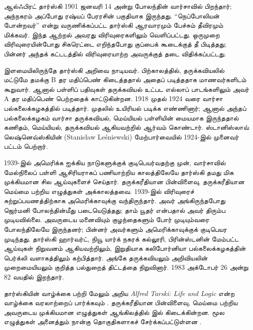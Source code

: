 \documentclass[../../../include/open-logic-section]{subfiles}
\begin{document}



ஆல்ஃபிரட் தார்ஸ்கி 1901 ஜனவரி 14 அன்று போலந்தின் வார்சாவில் பிறந்தார்;
அந்நகரம் அப்போது ரஷ்யப் பேரரசின் பகுதியாக இருந்தது. ``நெப்போலியன்
போன்றவர்'' என்று வருணிக்கப்பட்ட தார்ஸ்கி ஆரவாரமும் பேச்சும் தீவிரமும்
மிக்கவர். இந்த ஆற்றல் அவரது விரிவுரைகளிலும் வெளிப்பட்டது. ஒருமுறை
விரிவுரையின்போது சிகரெட்டை எறிந்தபோது குப்பைக் கூடைக்குத் தீ
பிடித்தது; பின்னர் அந்தக் கட்டடத்தில் விரிவுரையாற்ற அவருக்குத்
தடை விதிக்கப்பட்டது.

இளமையிலிருந்தே தார்ஸ்கி அறிவை நாடியவர். பிற்காலத்தில், தருக்கவியலில்
மட்டுமே தமக்கு B தர மதிப்பெண் கிடைத்ததால் அதைப் படித்ததாக மாணவர்களிடம்
கூறுவார். ஆனால் பள்ளிப் பதிவுகள் தருக்கவியல் உட்பட எல்லாப்
பாடங்களிலும் அவர் A தர மதிப்பெண் பெற்றதைக் காட்டுகின்றன. 1918 முதல்
1924 வரை வார்சா பல்கலைக்கழகத்தில் படித்தார். முதலில் உயிரியல்
படிக்க எண்ணினார்; ஆனால் அந்தப் பல்கலைக்கழகம் வார்சா தருக்கவியல்,
மெய்யியல் பள்ளியின் மையமாக இருந்ததால் கணிதம், மெய்யியல்,
தருக்கவியல் ஆகியவற்றில் ஆர்வம் கொண்டார். ஸ்டானிஸ்லாவ் லெஷ்னெவ்ஸ்கியின்
(Stanis\l{}aw Le\'{s}niewski) மேற்பார்வையில் 1924-இல் முனைவர்
பட்டம் பெற்றார்.

1939-இல் அமெரிக்க ஐக்கிய நாடுகளுக்குக் குடிபெயர்வதற்கு முன்,
வார்சாவில் மேல்நிலைப் பள்ளி ஆசிரியராகப் பணியாற்றிய காலத்திலேயே
தார்ஸ்கி தமது மிக முக்கியமான சில ஆய்வுகளைச் செய்தார். தருக்கரீதியான
பின்விளைவு, தருக்கரீதியான மெய்மை பற்றிய எழுத்துகள் அக்காலத்தவை.
1939-இல் விரிவுரைச் சுற்றுப்பயணத்திற்காக அமெரிக்காவுக்கு வந்திருந்தார்.
அவர் அங்கிருந்தபோது ஜெர்மனி போலந்தின்மீது படையெடுத்தது; தாம் யூதர்
என்பதால் அவர் திரும்ப முடியவில்லை. அவருடைய மனைவியும் குழந்தைகளும்
போர் முடியும்வரை போலந்திலேயே இருந்தனர்; பின்னர் அவர்களும்
அமெரிக்காவுக்குக் குடிபெயர முடிந்தது. தார்ஸ்கி ஹார்வர்ட்,
நியூ யார்க் நகரக் கல்லூரி, பிரின்ஸ்டனின் மேம்பட்ட ஆய்வுகள் நிறுவனம்
ஆகியவற்றிலும், இறுதியாக கலிபோர்னியா பல்கலைக்கழகத்தின் பெர்க்லி
வளாகத்திலும் கற்பித்தார். அங்கே தருக்கவியலும் அறிவியலின்
முறைமையியலும் குறித்த பல்துறைத் திட்டத்தை நிறுவினார். 1983
அக்டோபர் 26 அன்று 82 வயதில் இறந்தார்.

\begin{reading}
தார்ஸ்கியின் வாழ்க்கை பற்றி மேலும் அறிய \emph{Alfred Tarski: Life
  and Logic} என்ற வாழ்க்கை வரலாற்றைப் பார்க்கவும் \citep{Feferman2004}.
தருக்கரீதியான பின்விளைவு, மெய்மை பற்றிய அவருடைய முக்கியமான
எழுத்துகள் ஆங்கிலத்தில் \citep{Tarski1983} இல் கிடைக்கின்றன.
மூல எழுத்துகள் அனைத்தும் நான்கு தொகுதிகளாகச் சேர்க்கப்பட்டுள்ளன
\citep{Tarski1981}.
\end{reading}
\end{document}
